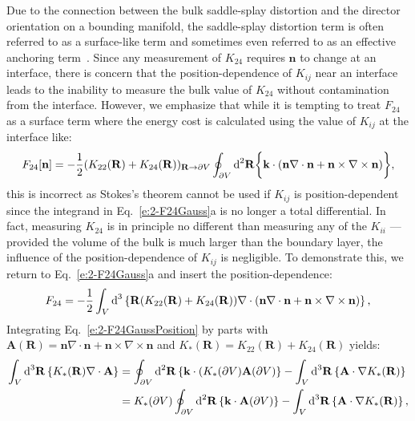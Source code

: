 Due to the connection between the bulk saddle-splay distortion and the director orientation on a bounding manifold, the saddle-splay distortion term is often referred to as a surface-like term and sometimes even referred to as an effective anchoring term~\cite{RN206,RN33,RN194,RN58,RN57,RN151}.
Since any measurement of $K_{24}$ requires $\mathbf{n}$ to change at an interface, there is concern that the position-dependence of $K_{ij}$ near an interface leads to the inability to measure the bulk value of $K_{24}$ without contamination from the interface.
However, we emphasize that while it is tempting to treat $F_{24}$ as a surface term where the energy cost is calculated using the value of $K_{ij}$ at the interface like:
\begin{equation}
  F_{24}[\mathbf{n}] = - \frac{1}{2}(K_{22}(\mathbf{R}) + K_{24}(\mathbf{R}))_{\mathbf{R} \rightarrow \partial V} \oint_{\partial V} \textup{d}^2  \mathbf{R} \bigg \{   \mathbf{k} \cdot (\mathbf{n}\nabla \cdot \mathbf{n} + \mathbf{n} \times \nabla \times \mathbf{n}) \bigg \},
\end{equation}
this is incorrect as Stokes's theorem cannot be used if $K_{ij}$ is position-dependent since the integrand in Eq.~\ref{e:2-F24Gauss}a is no longer a total differential.
In fact, measuring $K_{24}$ is in principle no different than measuring any of the $K_{ii}$ --- provided the volume of the bulk is much larger than the boundary layer, the influence of the position-dependence of $K_{ij}$ is negligible.
To demonstrate this, we return to Eq.~\ref{e:2-F24Gauss}a and insert the position-dependence:
\begin{equation}
  F_{24} = -\frac{1}{2}\int_{V}\textup{d}^3 \left \{\mathbf{R} (K_{22} (\mathbf{R}) + K_{24}(\mathbf{R})) \nabla \cdot (\mathbf{n} \nabla \cdot \mathbf{n} + \mathbf{n} \times \nabla \times \mathbf{n}) \right \},\label{e:2-F24GaussPosition}
\end{equation}
Integrating Eq.~\ref{e:2-F24GaussPosition} by parts with $\mathbf{A}(\mathbf{R}) = \mathbf{n} \nabla \cdot \mathbf{n} + \mathbf{n} \times \nabla \times \mathbf{n}$ and $K_*(\mathbf{R}) = K_{22} (\mathbf{R}) + K_{24}(\mathbf{R})$ yields:
\begin{align}
  \int_{V}\textup{d}^3\mathbf{R} \left \{ K_{*} (\mathbf{R}) \nabla \cdot \mathbf{A} \right \} &=
  \oint_{\partial V}\textup{d}^2 \mathbf{R} \left \{ \mathbf{k} \cdot (K_{*} (\partial V) \mathbf{A}(\partial V) \right \} -  \int_{V} \textup{d}^3\mathbf{R} \left \{ \mathbf{A} \cdot \nabla K_{*} (\mathbf{R}) \right \}  \\ &=
  K_*(\partial V) \oint_{\partial V} \textup{d}^2\mathbf{R} \left \{ \mathbf{k} \cdot \mathbf{A}(\partial V)\right \} - \int_{V} \textup{d}^3\mathbf{R} \left \{ \mathbf{A} \cdot \nabla K_{*} (\mathbf{R}) \right \}, \label{e:2-pos_stokes1}
\end{align}
